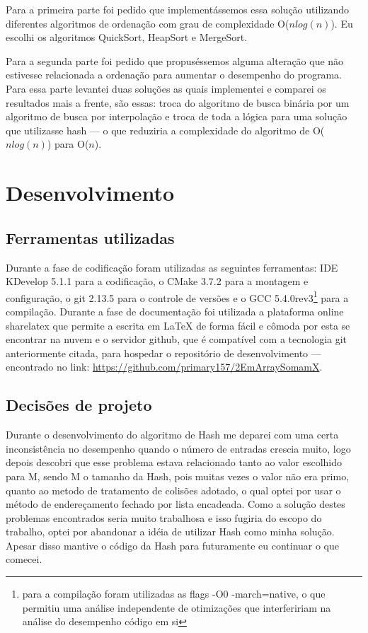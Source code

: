 \documentclass[12pt]{article}
\begin{document}
        Para a primeira parte foi pedido que implementássemos essa solução utilizando diferentes algoritmos de ordenação com grau de complexidade O($nlog(n)$). Eu escolhi os algoritmos QuickSort, HeapSort e MergeSort. 
        
        Para a segunda parte foi pedido que propuséssemos alguma alteração que não estivesse relacionada a ordenação para aumentar o desempenho do programa. Para essa parte levantei duas soluções as quais implementei e comparei os resultados mais a frente, são essas: troca do algoritmo de busca binária por um algoritmo de busca por interpolação e troca de toda a lógica para uma solução que utilizasse hash --- o que reduziria a complexidade do algoritmo de O($nlog(n)$) para O($n$).
    \section{Desenvolvimento}\label{desenvolvimento}
        \subsection{Ferramentas utilizadas}\label{ferramentas}
            Durante a fase de codificação foram utilizadas as seguintes ferramentas: IDE KDevelop 5.1.1 para a codificação, o CMake 3.7.2 para a montagem e configuração, o git 2.13.5 para o controle de versões e o GCC 5.4.0rev3\footnote{para a compilação foram utilizadas as flags -O0 -march=native, o que permitiu uma análise independente de otimizações que interfeririam na análise do desempenho código em si} para a compilação. Durante a fase de documentação foi utilizada a plataforma online sharelatex que permite a escrita em \LaTeX{} de forma fácil e cômoda por esta se encontrar na nuvem e o servidor github, que é compatível com a tecnologia git anteriormente citada, para hospedar o repositório de desenvolvimento --- encontrado no link: \url{https://github.com/primary157/2EmArraySomamX}.
        \subsection{Decisões de projeto}\label{decisoes}
            Durante o desenvolvimento do algoritmo de Hash me deparei com uma certa inconsistência no desempenho quando o número de entradas crescia muito, logo depois descobri que esse problema estava relacionado tanto ao valor escolhido para M, sendo M o tamanho da Hash, pois muitas vezes o valor não era primo, quanto ao metodo de tratamento de colisões adotado, o qual optei por usar o método de endereçamento fechado por lista encadeada. Como a solução destes problemas encontrados seria muito trabalhosa e isso fugiria do escopo do trabalho, optei por abandonar a idéia de utilizar Hash como minha solução. Apesar disso mantive o código da Hash para futuramente eu continuar o que comecei. 
\end{document}
